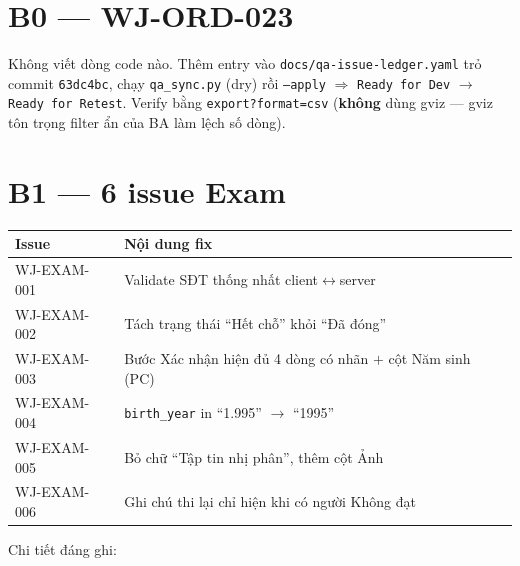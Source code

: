\section{B0 --- WJ-ORD-023}

Không viết dòng code nào. Thêm entry vào \texttt{docs/qa-issue-ledger.yaml} trỏ commit
\texttt{63dc4bc}, chạy \texttt{qa\_sync.py} (dry) rồi \texttt{--apply} $\Rightarrow$
\texttt{Ready for Dev} $\rightarrow$ \texttt{Ready for Retest}. Verify bằng
\texttt{export?format=csv} (\textbf{không} dùng gviz --- gviz tôn trọng filter ẩn của BA làm lệch
số dòng).

\section{B1 --- 6 issue Exam}

\begin{center}
\begin{tabular}{ll}
\hline
\textbf{Issue} & \textbf{Nội dung fix} \\
\hline
WJ-EXAM-001 & Validate SĐT thống nhất client$\leftrightarrow$server \\
WJ-EXAM-002 & Tách trạng thái ``Hết chỗ'' khỏi ``Đã đóng'' \\
WJ-EXAM-003 & Bước Xác nhận hiện đủ 4 dòng có nhãn $+$ cột Năm sinh (PC) \\
WJ-EXAM-004 & \texttt{birth\_year} in ``1.995'' $\rightarrow$ ``1995'' \\
WJ-EXAM-005 & Bỏ chữ ``Tập tin nhị phân'', thêm cột Ảnh \\
WJ-EXAM-006 & Ghi chú thi lại chỉ hiện khi có người Không đạt \\
\hline
\end{tabular}
\end{center}

Chi tiết đáng ghi:

